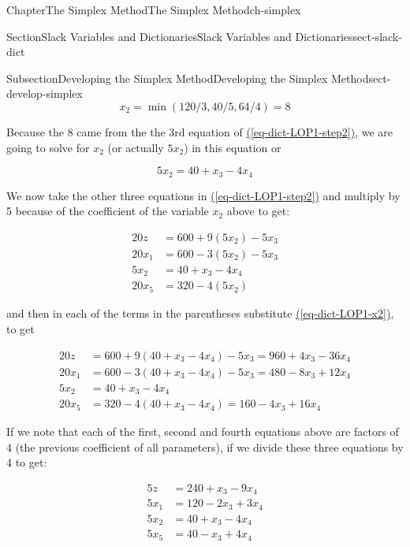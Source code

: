 \documentclass[oneside,10pt,]{book}
\newcommand{\xreffont}{\relax}
\numberwithin{equation}{section}
\newcommand{\amp}{&}
\begin{document}
\begin{chapterptx}{Chapter}{The Simplex Method}{}{The Simplex Method}{}{}{ch-simplex}
\begin{sectionptx}{Section}{Slack Variables and Dictionaries}{}{Slack Variables and Dictionaries}{}{}{sect-slack-dict}
\begin{subsectionptx}{Subsection}{Developing the Simplex Method}{}{Developing the Simplex Method}{}{}{sect-develop-simplex}
\begin{equation*}
x_2= \min(120/3, 40/5,64/4) = 8
\end{equation*}
%
\par
Because the 8 came from the the 3rd equation of \hyperref[eq-dict-LOP1-step2]{({\xreffont\ref{eq-dict-LOP1-step2}})}, we are going to solve for \(x_2\) (or actually \(5x_2\)) in this equation or%
\par
%
\begin{equation}
5 x_2 = 40 + x_3 - 4x_4\label{eq-dict-LOP1-x2}
\end{equation}
%
\par
We now take the other three equations in \hyperref[eq-dict-LOP1-step2]{({\xreffont\ref{eq-dict-LOP1-step2}})} and multiply by 5 because of the coefficient of the variable \(x_2\) above to get:%
\par
%
\begin{align*}
20 z \amp = 600 + 9 (5x_2) - 5 x_3 \\
20 x_1 \amp = 600 - 3 (5x_2) - 5 x_3\\
5x_2 \amp =40 + x_3 - 4x_4 \\
20 x_5 \amp =320 - 4 (5 x_2)
\end{align*}
%
\par
and then in each of the terms in the parentheses substitute \hyperref[eq-dict-LOP1-x2]{({\xreffont\ref{eq-dict-LOP1-x2}})}, to get%
\par
%
\begin{align*}
20 z \amp = 600 + 9 (40 + x_3-4x_4) - 5 x_3 = 960 + 4x_3 - 36 x_4 \\
20 x_1 \amp = 600 - 3 (40 + x_3-4x_4) - 5 x_3 = 480 - 8x_3 + 12 x_4\\
5x_2 \amp =40 + x_3 - 4x_4 \\
20 x_5 \amp =320 - 4 (40 + x_3-4x_4) = 160 - 4x_3 + 16 x_4
\end{align*}
%
\par
If we note that each of the first, second and fourth equations above are factors of 4 (the previous coefficient of all parameters), if we divide these three equations by 4 to get:%
\par
%
\begin{equation}
\begin{aligned} 5 z \amp = 240 + x_3 - 9 x_4  \\ 5 x_1 \amp = 120 - 2x_3 + 3 x_4 \\ 5x_2 \amp =40 + x_3 - 4x_4  \\ 5 x_5 \amp = 40 - x_3 + 4 x_4 \end{aligned}\label{eq-dict-LOP1-step3}
\end{equation}

\end{subsectionptx}
\end{sectionptx}
\end{chapterptx}
\end{document}
